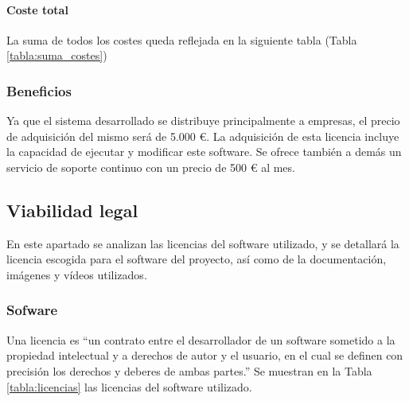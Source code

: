 \paragraph{Coste total}

La suma de todos los costes queda reflejada en la siguiente tabla (Tabla \ref{tabla:suma_costes})


\subsubsection{Beneficios}

Ya que el sistema desarrollado se distribuye principalmente a empresas, el precio de adquisición del
mismo será de 5.000 €. La adquisición de esta licencia incluye la capacidad de ejecutar y modificar este 
software. Se ofrece también a demás un servicio de soporte continuo con un precio de 500 € al mes.

\subsection{Viabilidad legal}

En este apartado se analizan las licencias del software utilizado, y se detallará la licencia 
escogida para el software del proyecto, así como de la documentación, imágenes y vídeos utilizados.

\subsubsection{Sofware}

Una licencia es ``un contrato entre el desarrollador de un software sometido a la propiedad
intelectual y a derechos de autor y el usuario, en el cual se definen con precisión los 
derechos y deberes de ambas partes.'' \cite{labrador2012tipos}
Se muestran en la Tabla \ref{tabla:licencias} las licencias del software utilizado.


